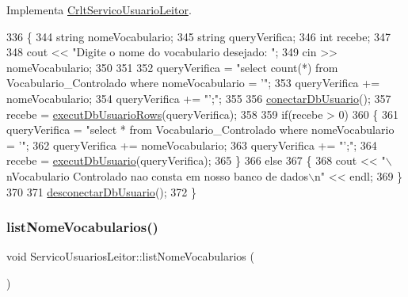 Implementa \mbox{\hyperlink{class_crlt_servico_usuario_leitor_a44a3bc16ef0888d8ce7dd0c9f03fdc58}{Crlt\+Servico\+Usuario\+Leitor}}.


\begin{DoxyCode}
336 \{
344   \textcolor{keywordtype}{string} nomeVocabulario;
345   \textcolor{keywordtype}{string} queryVerifica;
346   \textcolor{keywordtype}{int} recebe;
347 
348   cout << \textcolor{stringliteral}{"Digite o nome do vocabulario desejado: "};
349   cin >> nomeVocabulario;
350 
351 
352   queryVerifica = \textcolor{stringliteral}{"select count(*) from Vocabulario\_Controlado where nomeVocabulario = '"};
353   queryVerifica += nomeVocabulario;
354   queryVerifica += \textcolor{stringliteral}{"';"};
355 
356   \mbox{\hyperlink{comando_sql_8cpp_a4f89ddcbc4cf8f2587d89f72f8c7900d}{conectarDbUsuario}}();
357   recebe = \mbox{\hyperlink{comando_sql_8cpp_af54952694f2fa7d76f969fb74b853cb9}{executDbUsuarioRows}}(queryVerifica);
358 
359   \textcolor{keywordflow}{if}(recebe > 0)
360       \{
361         queryVerifica = \textcolor{stringliteral}{"select * from Vocabulario\_Controlado where nomeVocabulario = '"};
362         queryVerifica += nomeVocabulario;
363         queryVerifica += \textcolor{stringliteral}{"';"};
364         recebe = \mbox{\hyperlink{comando_sql_8cpp_a748197580e7f9acdbf48c78de1f7924b}{executDbUsuario}}(queryVerifica);
365       \}
366   \textcolor{keywordflow}{else}
367       \{
368         cout << \textcolor{stringliteral}{"\(\backslash\)nVocabulario Controlado nao consta em nosso banco de dados\(\backslash\)n"} << endl;
369       \}
370 
371       \mbox{\hyperlink{comando_sql_8cpp_a969be9911913568e30d4ae8963338bc3}{desconectarDbUsuario}}();
372   \}
\end{DoxyCode}
\mbox{\label{class_servico_usuarios_leitor_a376f7cdbdea50d9a01ce611e79d346c4}} 
\subsubsection{\texorpdfstring{list\+Nome\+Vocabularios()}{listNomeVocabularios()}}
{\footnotesize\ttfamily void Servico\+Usuarios\+Leitor\+::list\+Nome\+Vocabularios (\begin{DoxyParamCaption}{ }\end{DoxyParamCaption})\hspace{0.3cm}{\ttfamily [virtual]}}

